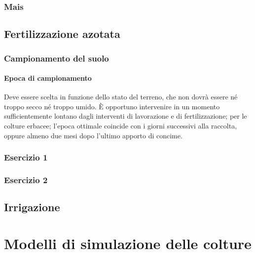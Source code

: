 \documentclass[
]{book}
\theoremstyle{definition}
\theoremstyle{definition}
\theoremstyle{definition}
\theoremstyle{definition}
\theoremstyle{remark}
\begin{document}
\hypertarget{mais}{%
\subsection{Mais}\label{mais}}

\hypertarget{fertilizzazione-azotata}{%
\section{Fertilizzazione azotata}\label{fertilizzazione-azotata}}

\hypertarget{campionamento-del-suolo}{%
\subsection{Campionamento del suolo}\label{campionamento-del-suolo}}

\hypertarget{epoca-di-campionamento}{%
\subsubsection{Epoca di campionamento}\label{epoca-di-campionamento}}

Deve essere scelta in funzione dello stato del terreno, che non dovrà essere né troppo secco né troppo umido. È opportuno intervenire in un momento sufficientemente lontano dagli interventi di lavorazione e di fertilizzazione; per le colture erbacee; l'epoca ottimale coincide con i giorni successivi alla raccolta, oppure almeno due mesi dopo l'ultimo apporto di concime.

\hypertarget{esercizio-1}{%
\subsection{Esercizio 1}\label{esercizio-1}}

\hypertarget{esercizio-2}{%
\subsection{Esercizio 2}\label{esercizio-2}}

\hypertarget{irrigazione}{%
\section{Irrigazione}\label{irrigazione}}

\hypertarget{modelli-di-simulazione-delle-colture}{%
\chapter{Modelli di simulazione delle colture}\label{modelli-di-simulazione-delle-colture}}
\end{document}
